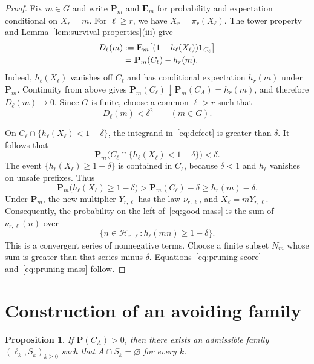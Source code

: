 \documentclass[11pt]{amsart}
\newtheorem{proposition}[theorem]{Proposition}
\theoremstyle{definition}
\numberwithin{equation}{section}
\newcommand{\Prob}{\mathbf P}
\newcommand{\Exp}{\mathbf E}
\newcommand{\one}{\mathbf 1}
\newcommand{\Hblock}[2]{\mathcal H_{#1,#2}}
\begin{document}
\begin{proof}
Fix $m\in G$ and write $\Prob_m$ and $\Exp_m$ for probability and expectation conditional on $X_r=m$.
For $\ell\geq r$, we have $X_r=\pi_r(X_\ell)$.
The tower property and Lemma~\ref{lem:survival-properties}\textup{(iii)} give
\begin{align}
  D_\ell(m)
    &:=\Exp_m\bigl[(1-h_\ell(X_\ell))\one_{C_\ell}\bigr]\notag\\
    &=\Prob_m(C_\ell)-h_r(m).\label{eq:defect}
\end{align}
Indeed, $h_\ell(X_\ell)$ vanishes off $C_\ell$ and has conditional expectation $h_r(m)$ under $\Prob_m$.
Continuity from above gives
$\Prob_m(C_\ell)\downarrow\Prob_m(C_A)=h_r(m)$, and therefore $D_\ell(m)\to0$.
Since $G$ is finite, choose a common $\ell>r$ such that
\begin{equation}\label{eq:small-defect}
  D_\ell(m)<\delta^2\qquad(m\in G).
\end{equation}

On $C_\ell\cap\{h_\ell(X_\ell)<1-\delta\}$, the integrand in~\eqref{eq:defect} is greater than $\delta$.
It follows that
\[
  \Prob_m\bigl(C_\ell\cap\{h_\ell(X_\ell)<1-\delta\}\bigr)<\delta.
\]
The event $\{h_\ell(X_\ell)\geq1-\delta\}$ is contained in $C_\ell$, because $\delta<1$ and $h_\ell$ vanishes on unsafe prefixes.
Thus
\begin{equation}\label{eq:good-mass}
  \Prob_m\bigl(h_\ell(X_\ell)\geq1-\delta\bigr)
     >\Prob_m(C_\ell)-\delta
     \geq h_r(m)-\delta.
\end{equation}
Under $\Prob_m$, the new multiplier $Y_{r,\ell}$ has the law $\nu_{r,\ell}$, and $X_\ell=mY_{r,\ell}$.
Consequently, the probability on the left of~\eqref{eq:good-mass} is the sum of $\nu_{r,\ell}(n)$ over
\[
  \{n\in\Hblock{r}{\ell}:h_\ell(mn)\geq1-\delta\}.
\]
This is a convergent series of nonnegative terms.
Choose a finite subset $N_m$ whose sum is greater than that series minus $\delta$.
Equations~\eqref{eq:pruning-score} and~\eqref{eq:pruning-mass} follow.
\end{proof}

\section{Construction of an avoiding family}

\begin{proposition}\label{prop:construction}
If $\Prob(C_A)>0$, then there exists an admissible family $(\ell_k,S_k)_{k\geq0}$ such that $A\cap S_k=\varnothing$ for every $k$.
\end{proposition}
\end{document}

